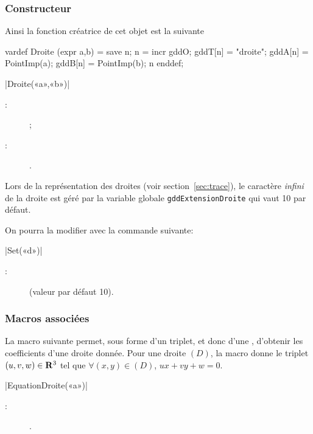 \documentclass[a4paper,french]{article}
\begin{document}
\subsubsection{Constructeur}

Ainsi la fonction créatrice de cet objet est la suivante
\begin{mpcode}
vardef Droite (expr a,b) =
  save n; n = incr gddO;
  gddT[n] = "droite"; gddA[n] = PointImp(a); gddB[n] = PointImp(b); n
enddef;
\end{mpcode}
\begin{colourband}
\macro|Droite(«a»,«b»)|
\begin{description}
  \item[:]   ;
  \item[:]  .
\end{description}
\end{colourband}
\bigskip

Lors de la représentation des droites (voir section~\ref{sec:trace}), le
caractère \emph{infini} de la droite est géré par la variable globale
\lstinline+gddExtensionDroite+ 
qui vaut 10 par défaut.



On pourra la modifier avec la commande suivante:
\begin{colourband}
\macro|Set(«d»)|
\begin{description}
  \item[:]   (valeur par défaut 10).
\end{description}
\end{colourband}
\bigskip


\subsubsection{Macros associées}


La macro suivante permet, sous forme d'un triplet, et donc d'une ,
d'obtenir les coefficients d'une droite donnée. Pour une droite $(D)$, la macro
donne le triplet $(u,v,w)\in\mathbf{R}^3$ tel que $\forall (x,y)\in(D)$, $ux+vy+w=0$.

\begin{colourband}
\macro|EquationDroite(«a»)|
\begin{description}
  \item[:]  .
\end{description}
\end{colourband}
\end{document}
